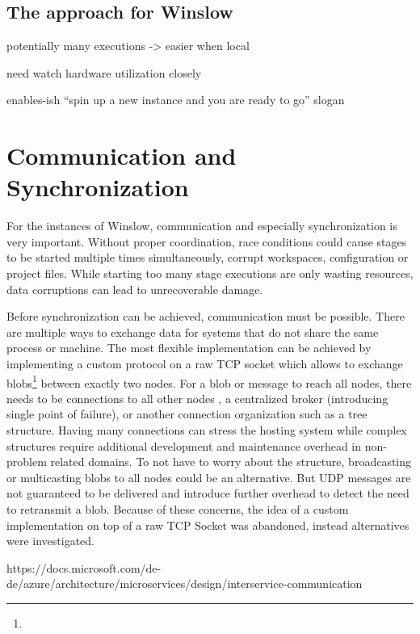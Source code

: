 

\subsection{The approach for Winslow}


potentially many executions -> easier when local

need watch hardware utilization closely

enables-ish \enquote{spin up a new instance and you are ready to go} slogan

\section{Communication and Synchronization}


For the instances of Winslow, communication and especially synchronization is very important.
Without proper coordination, race conditions could cause stages to be started multiple times simultaneously, corrupt workspaces, configuration or project files.
While starting too many stage executions are only wasting resources, data corruptions can lead to unrecoverable damage.

Before synchronization can be achieved, communication must be possible.
There are multiple ways to exchange data for systems that do not share the same process or machine.
The most flexible implementation can be achieved by implementing a custom protocol on a raw TCP socket which allows to exchange blobs\footnote{} between exactly two nodes.
For a blob or message to reach all nodes, there needs to be connections to all other nodes , a centralized broker (introducing single point of failure), or another connection organization such as a tree structure.
Having many connections can stress the hosting system while complex structures require additional development and maintenance overhead in non-problem related domains.
To not have to worry about the structure, broadcasting or multicasting blobs to all nodes could be an alternative.
But UDP messages are not guaranteed to be delivered and introduce further overhead to detect the need to retransmit a blob.
Because of these concerns, the idea of a custom implementation on top of a raw TCP Socket was abandoned, instead alternatives were investigated.


https://docs.microsoft.com/de-de/azure/architecture/microservices/design/interservice-communication


